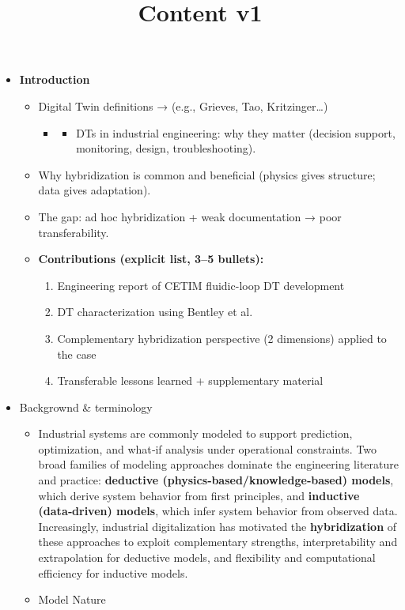 \documentclass[
]{article}
\title{Content v1}
\author{}
\date{}
\providecommand{\tightlist}{%
  \setlength{\itemsep}{0pt}\setlength{\parskip}{0pt}}
\begin{document}
\maketitle

\begin{itemize}
\item
  \textbf{Introduction}

  \begin{itemize}
  \tightlist
  \item
    Digital Twin definitions → (e.g., Grieves, Tao, Kritzinger\ldots)

    \begin{itemize}
    \tightlist
    \item
      \begin{itemize}
      \tightlist
      \item
        DTs in industrial engineering: why they matter (decision
        support, monitoring, design, troubleshooting).
      \end{itemize}
    \end{itemize}
  \item
    Why hybridization is common and beneficial (physics gives structure;
    data gives adaptation).
  \item
    The gap: ad hoc hybridization + weak documentation → poor
    transferability.
  \item
    \textbf{Contributions (explicit list, 3--5 bullets):}

    \begin{enumerate}
    \tightlist
    \item
      Engineering report of CETIM fluidic-loop DT development
    \item
      DT characterization using Bentley et al.
    \item
      Complementary hybridization perspective (2 dimensions) applied to
      the case
    \item
      Transferable lessons learned + supplementary material
    \end{enumerate}
  \end{itemize}
\item
  Backgrownd \& terminology

  \begin{itemize}
  \item
    Industrial systems are commonly modeled to support prediction,
    optimization, and what‑if analysis under operational constraints.
    Two broad families of modeling approaches dominate the engineering
    literature and practice: \textbf{deductive
    (physics‑based/knowledge‑based) models}, which derive system
    behavior from first principles, and \textbf{inductive (data‑driven)
    models}, which infer system behavior from observed data.
    Increasingly, industrial digitalization has motivated the
    \textbf{hybridization} of these approaches to exploit complementary
    strengths, interpretability and extrapolation for deductive models,
    and flexibility and computational efficiency for inductive models.
  \item
    Model Nature


\end{itemize}
\end{itemize}
\end{document}
